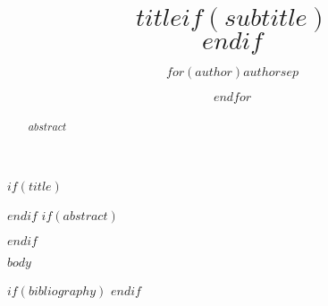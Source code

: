 \documentclass[12pt,a4paper]{article} %
\title{$title$$if(subtitle)$\\\vspace{0.5em}{\large $subtitle$}$endif$}
\author{$for(author)$$author$$sep$ \and $endfor$}
\begin{document}
$if(title)$
\maketitle
$endif$
$if(abstract)$
\begin{abstract}
$abstract$
\end{abstract}
$endif$

$body$

$if(bibliography)$
\printbibliography[title=References]
$endif$
\end{document}
